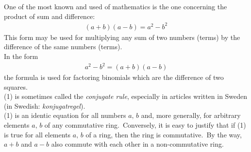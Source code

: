 \documentclass[12pt]{article}
\theoremstyle{definition}
\begin{document}
 

One of the most known and used  of mathematics is the one concerning the product of sum and difference:
\begin{align}
(a+b)(a-b) = a^2-b^2
\end{align}
This form may be used for multiplying any sum of two numbers (terms) by the difference of the same numbers (terms).\\

In the form
\begin{align}
a^2-b^2 = (a+b)(a-b)
\end{align}
the formula is used for factoring binomials which are the difference of two squares.\\

(1) is sometimes called the {\em conjugate rule}, especially in articles written in Sweden (in Swedish: {\em konjugatregel}).\\

(1) is an identic equation for all numbers $a,\,b$ and, more generally, for arbitrary elements $a,\,b$ of any commutative ring.\, Conversely, it is easy to justify that if (1) is true for all elements $a,\,b$ of a ring, then the ring is commutative.\, By the way, $a\!+\!b$ and $a\!-\!b$ also commute with each other in a non-commutative ring.

		

\end{document}
